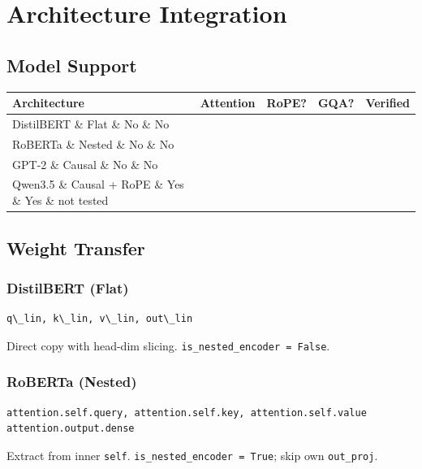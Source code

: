 
\section{Architecture Integration}

\subsection{Model Support}

\begin{table}[H]
\centering
\small
\begin{tabular}{lllll}
\toprule
\textbf{Architecture} & \textbf{Attention} & \textbf{RoPE?} & \textbf{GQA?} & \textbf{Verified} \\
\midrule
DistilBERT \& Flat \& No \& No &  \\
RoBERTa \& Nested \& No \& No &  \\
GPT-2 \& Causal \& No \& No &  \\
Qwen3.5 \& Causal + RoPE \& Yes \& Yes \& not tested \\
\bottomrule
\end{tabular}
\end{table}

\subsection{Weight Transfer}

\subsubsection{DistilBERT (Flat)}

\begin{lstlisting}
q\_lin, k\_lin, v\_lin, out\_lin
\end{lstlisting}

Direct copy with head-dim slicing. \texttt{is\_nested\_encoder = False}.

\subsubsection{RoBERTa (Nested)}

\begin{lstlisting}
attention.self.query, attention.self.key, attention.self.value
attention.output.dense
\end{lstlisting}

Extract from inner \texttt{self}. \texttt{is\_nested\_encoder = True}; skip own \texttt{out\_proj}.

